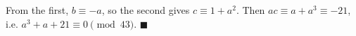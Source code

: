 From the first, $b\equiv-a$, so the second gives $c\equiv1+a^2$. Then $ac\equiv a+a^3\equiv-21$, i.e. $a^3+a+21\equiv0\pmod{43}$. $\blacksquare$

